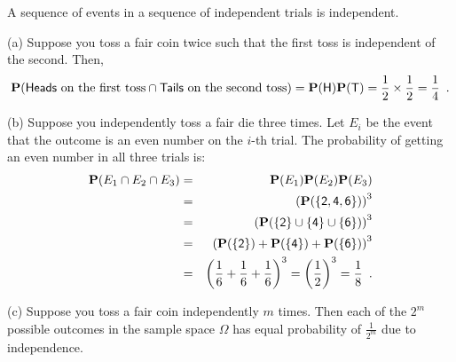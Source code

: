 \begin{example}
A sequence of events in a sequence of independent trials is independent.
\be

\item[(a)] Suppose you toss a fair coin twice such that the first toss is independent of the second.  Then,
$$
\mathbf{P}(\mathsf{Heads} \text{ on the first toss} \cap \mathsf{Tails} \text{ on the second toss} ) = \mathbf{P}(\mathsf{H}) \mathbf{P}(\mathsf{T}) = \frac{1}{2} \times \frac{1}{2}= \frac{1}{4} \enspace .
$$

\item[(b)] Suppose you independently toss a fair die three times.  Let $E_i$ be the event that the outcome is an even number on the $i$-th trial.  The probability of getting an even number in all three trials is:
\begin{eqnarray*}
\mathbf{P}(E_1 \cap E_2 \cap E_3)
&=& \mathbf{P}(E_1) \mathbf{P}(E_2) \mathbf{P}(E_3)\\
&=& \left(\mathbf{P}(\{\mathsf{2,4,6}\})\right)^3\\
&=& \left(\mathbf{P}(\{\mathsf{2}\} \cup \{\mathsf{4}\} \cup \{\mathsf{6}\}) \right)^3 \\
&=& \left(\mathbf{P}(\{\mathsf{2}\}) + \mathbf{P}(\{\mathsf{4}\}) + \mathbf{P}(\{\mathsf{6}\})\right)^3\\
&=& \left(\frac{1}{6} + \frac{1}{6} + \frac{1}{6} \right)^3 
= \left(\frac{1}{2} \right)^3
= \frac{1}{8} \enspace .
\end{eqnarray*}

\item[(c)]Suppose you toss a fair coin independently $m$ times.  Then each of the $2^m$ possible outcomes in the sample space $\Omega$ has equal probability of $\frac{1}{2^m}$ due to independence.
\ee
\end{example}

